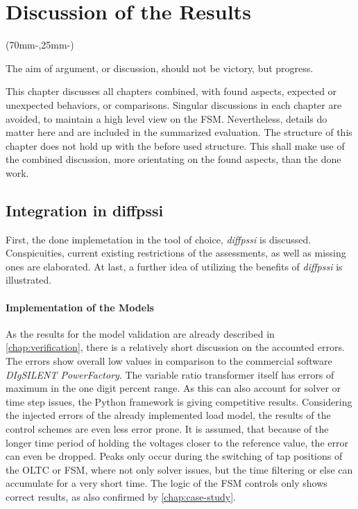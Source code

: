 

\chapter{Discussion of the Results}
\label{chap:discussion}

\begin{textblock*}{.7\textwidth}(70mm-\offset,25mm-\offset)
    \begin{fquote}
        The aim of argument, or discussion, should not be victory, but progress.
    \end{fquote}
\end{textblock*}

This chapter discusses all chapters combined, with found aspects, expected or unexpected behaviors, or comparisons.
Singular discussions in each chapter are avoided, to maintain a high level view on the \acs{FSM}.
Nevertheless, details do matter here and are included in the summarized evaluation.
The structure of this chapter does not hold up with the before used structure.
This shall make use of the combined discussion, more orientating on the found aspects, than the done work. 

\section{Integration in diffpssi}

First, the done implemetation in the tool of choice, \textit{diffpssi} is discussed.
Conspicuities, current existing restrictions of the assessments, as well as missing ones are elaborated.
At last, a further idea of utilizing the benefits of \textit{diffpssi} is illustrated.

\subsubsection{Implementation of the Models}

As the results for the model validation are already described in \autoref{chap:verification}, there is a relatively short discussion on the accounted errors.
The errors show overall low values in comparison to the commercial software \textit{DIgSILENT PowerFactory}.
The variable ratio transformer itself has errors of maximum in the one digit percent range.
As this can also account for solver or time step issues, the Python framework is giving competitive results.
Considering the injected errors of the already implemented load model, the results of the control schemes are even less error prone.
It is assumed, that because of the longer time period of holding the voltages closer to the reference value, the error can even be dropped. 
Peaks only occur during the switching of tap positions of the \acs{OLTC} or \acs{FSM}, where not only solver issues, but the time filtering or else can accumulate for a very short time.
The logic of the \acs{FSM} controls only shows correct results, as also confirmed by \autoref{chap:case-study}.

